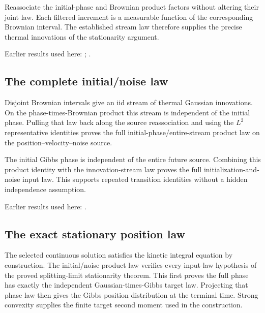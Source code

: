 \documentclass[11pt,a4paper]{report}
\begin{document}
Reassociate the initial-phase and Brownian product factors without altering their joint law. Each filtered increment is a measurable function of the corresponding Brownian interval. The established stream law therefore supplies the precise thermal innovations of the stationarity argument.



Earlier results used here: \cite[Section~3.8.16]{LangevinLean2026ULASC}; \cite[Section~3.8.17]{LangevinLean2026ULASC}.
\subsection{\texorpdfstring{The complete initial/\allowbreak{}noise law}{The complete initial/noise law}}
\label{report-step-KineticLangevin-ContinuousGibbs-lean-2}


Disjoint Brownian intervals give an iid stream of thermal Gaussian innovations. On the phase-times-Brownian product this stream is independent of the initial phase. Pulling that law back along the source reassociation and using the \(L^{2}\) representative identities proves the full initial-phase/\allowbreak{}entire-stream product law on the position–velocity–noise source.



The initial Gibbs phase is independent of the entire future source. Combining this product identity with the innovation-stream law proves the full initialization-and-noise input law. This supports repeated transition identities without a hidden independence assumption.



Earlier results used here: \cite[Section~3.8.17]{LangevinLean2026ULASC}.
\subsection{\texorpdfstring{The exact stationary position law}{The exact stationary position law}}
\label{report-step-KineticLangevin-ContinuousGibbs-lean-3}


The selected continuous solution satisfies the kinetic integral equation by construction. The initial/\allowbreak{}noise product law verifies every input-law hypothesis of the proved splitting-limit stationarity theorem. This first proves the full phase has exactly the independent Gaussian-times-Gibbs target law. Projecting that phase law then gives the Gibbs position distribution at the terminal time. Strong convexity supplies the finite target second moment used in the construction.
\end{document}
